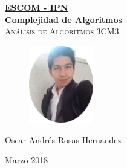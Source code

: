 \documentclass[12pt, fleqn]{article}                            %
\author{Oscar Andrés Rosas}                                     %
\theoremstyle{break}                                            %
\begin{document}
\begin{titlepage}
    
    \pagecolor{TitlePageColor}                                      %
    \color{white}                                                   %

    \vspace                                                         %
    \baselineskip                                                   %

    \makebox[0pt][l]{\rule{1.3\textwidth}{3pt}}                     %
    
    \href{https://compilandoconocimiento.com/}                      %
    {\textbf{\textsc{\Huge ESCOM - IPN}}}\\[2.7cm]                  %

    \href{https://github.com/CompilandoConocimiento/}               %
    {\fontsize{65}{78}\selectfont \textbf{Complejidad de Algoritmos}}\\[0.5cm]     %
    \textcolor{ColorSubtext}{\textsc{\Huge Análisis de Algoritmos 3CM3}}\\[2cm]%
    
    \vfill                                                          %

    \begin{figure}[h]
        \includegraphics[width=0.25\textwidth]{Photo}
    \end{figure}
    
    \href{ProjectAuthorLink}                                        %
    {\LARGE \textsf{Oscar Andrés Rosas Hernandez}}                  %

    \vspace                                                         %
    \baselineskip                                                   %
    
    {\large \textsf{Marzo 2018}}                                    %

\end{titlepage}
\end{document}
